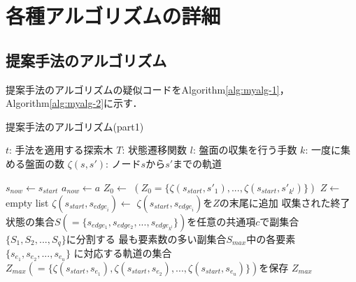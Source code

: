 \chapter{各種アルゴリズムの詳細}
\label{chap:alg}
\section{提案手法のアルゴリズム}
提案手法のアルゴリズムの疑似コードをAlgorithm\ref{alg:myalg-1}，Algorithm\ref{alg:myalg-2}に示す．
\begin{algorithm}
    
    \caption{提案手法のアルゴリズム(part1)}
    \label{alg:myalg-1}
    \begin{algorithmic}[1]
        \State $t$: 手法を適用する探索木
        \State $T$: 状態遷移関数
        \State $l$: 盤面の収集を行う手数
        \State $k$: 一度に集める盤面の数
        \State $\zeta(s, s')$: ノード$s$から$s'$までの軌道
        
       
           \State $s_{now}\gets s_{start}$
           \State $a_{now}\gets a$
           \State $Z_0 \gets$
           \State $(Z_0 =\{\zeta(s_{start}, {s'}_1), ..., \zeta(s_{start}, {s'}_{k^l})\})$
           \State $ Z \gets$ empty list
             \State $\zeta(s_{start}, s_{{edge}_i}) \gets$ 
             \State $\zeta(s_{start}, s_{{edge}_i})$を$Z$の末尾に追加
           \EndFor
           \State 収集された終了状態の集合$S(=\{s_{edge_1},s_{edge_2}, ..., s_{edge_{k^l}}\})$を任意の共通項$c$で副集合$\{S_1, S_2, ..., S_q\}$に分割する
           \State 最も要素数の多い副集合$S_{max}$中の各要素$\{s_{e_1}, s_{e_2}, ...,  s_{e_u}\}$
           \State に対応する軌道の集合$Z_{max}(=\{\zeta(s_{start}, s_{e_1}), \zeta(s_{start}, s_{e_2}), ..., \zeta(s_{start}, s_{e_u})\})$を保存
           \State \Return $Z_{max}$
        \EndFunction
    \end{algorithmic}
\end{algorithm}
